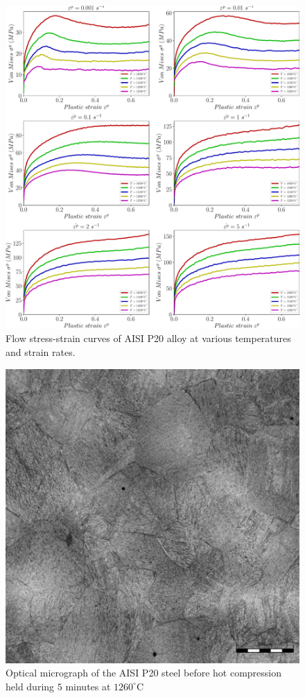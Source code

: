 \documentclass[twoside,english,1p,final,sort&compress]{elsarticle}
\theoremstyle{plain}
\begin{document}
\begin{figure}[!ht]
\centering
\includegraphics[width=1.02\columnwidth]
{newFigures/rawData}
\caption{Flow stress-strain curves of AISI P20 alloy at various temperatures and strain rates.}
\label{fig:rawData}
\end{figure}
\begin{figure}[!ht]
\centering
\includegraphics[width=0.9\columnwidth]
{newFigures/BeforeCompM}
\caption{Optical micrograph of the AISI P20 steel before hot compression held during $5$ minutes at $1260^\circ$C}
\label{fig:BeforeCompM}
\end{figure}
\end{document}
